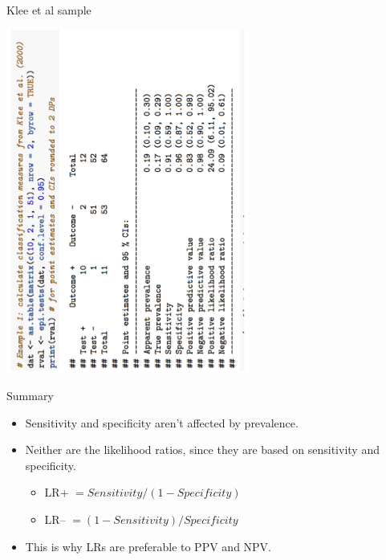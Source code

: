 \documentclass{beamer}
\begin{document}
% 
\begin{frame}{Klee et al sample} 
	\begin{center}
	\includegraphics[angle=270, width=8cm]{images/epiR_screenshot1.pdf}
	\end{center}	
\end{frame}

% 
\begin{frame}{Summary}
	\begin{itemize}
	\item Sensitivity and specificity aren't affected by prevalence.
	\item Neither are the likelihood ratios, since they are based on sensitivity and specificity.
		\begin{itemize}
		\item LR+ $= Sensitivity / (1 - Specificity)$
		\item LR-- $= (1 - Sensitivity) /  Specificity$
		\end{itemize} 
	\item This is why LRs are preferable to PPV and NPV.
	\end{itemize}
\end{frame}
\end{document}
